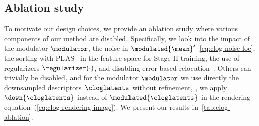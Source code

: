 
  \subsection{Ablation study}
    To motivate our design choices, we provide an ablation study where various
    components of our method are disabled.
    Specifically, we look into the impact of the modulator $\modulator$, the
    noise in $\modulated{\mean}'$~\cref{eq:clog-noise-loc}, the sorting with
    PLAS~\cite{morgenstern2024compact} in the feature space for Stage II
    training, the use of regularizers $\regularizer(\cdot)$, and disabling
    error-based relocation~\cite{bulo2024revising}.
    Others can trivially be disabled, and for the modulator $\modulator$ we
    use directly the downsampled descriptors~$\cloglatents$ without
    refinement, \ie, we apply $\down{\cloglatents}$ instead of
    $\modulated{\cloglatents}$ in the rendering
    equation~(\cref{eq:clog-rendering-image}).
    We present our results in~\cref{tab:clog-ablation}.
